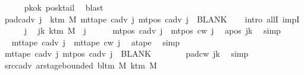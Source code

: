\begin{isabellebody}
\ \ \ \ \isamarkupfalse%
\ pkok\ posk{}{\isacharunderscore}{\kern0pt}tail\ \isamarkupfalse%
\ blast\isanewline
\ \ \isamarkupfalse%
\ pad{\isacharunderscore}{\kern0pt}cadv{\isacharcolon}{\kern0pt}\ {\isachardoublequoteopen}{\isasymforall}j\ {\isasymge}\ k{\isacharunderscore}{\kern0pt}tm\ M{\isachardot}{\kern0pt}\ mt{\isacharunderscore}{\kern0pt}tape\ c{\isacharunderscore}{\kern0pt}adv\ j\ {\isacharparenleft}{\kern0pt}mt{\isacharunderscore}{\kern0pt}pos\ c{\isacharunderscore}{\kern0pt}adv\ j{\isacharparenright}{\kern0pt}\ {\isacharequal}{\kern0pt}\ BLANK{}{\isachardoublequoteclose}\isanewline
\ \ \isamarkupfalse%
\ {\isacharparenleft}{\kern0pt}intro\ allI\ impI{\isacharparenright}{\kern0pt}\isanewline
\ \ \ \ \isamarkupfalse%
\ j\ \isamarkupfalse%
\ jk{\isacharcolon}{\kern0pt}\ {\isachardoublequoteopen}k{\isacharunderscore}{\kern0pt}tm\ M\ {\isasymle}\ j{\isachardoublequoteclose}\isanewline
\ \ \ \ \isamarkupfalse%
\ {\isachardoublequoteopen}mt{\isacharunderscore}{\kern0pt}pos\ c{\isacharunderscore}{\kern0pt}adv\ j\ {\isacharequal}{\kern0pt}\ mt{\isacharunderscore}{\kern0pt}pos\ c{\isacharunderscore}{\kern0pt}w\ j{\isachardoublequoteclose}\ \isamarkupfalse%
\ a{\isacharunderscore}{\kern0pt}pos\ jk\ \isamarkupfalse%
\ simp\isanewline
\ \ \ \ \isamarkupfalse%
\ \isamarkupfalse%
\ {\isachardoublequoteopen}mt{\isacharunderscore}{\kern0pt}tape\ c{\isacharunderscore}{\kern0pt}adv\ j\ {\isacharequal}{\kern0pt}\ mt{\isacharunderscore}{\kern0pt}tape\ c{\isacharunderscore}{\kern0pt}w\ j{\isachardoublequoteclose}\ \isamarkupfalse%
\ a{\isacharunderscore}{\kern0pt}tape\ \isamarkupfalse%
\ simp\isanewline
\ \ \ \ \isamarkupfalse%
\ \isamarkupfalse%
\ {\isachardoublequoteopen}mt{\isacharunderscore}{\kern0pt}tape\ c{\isacharunderscore}{\kern0pt}adv\ j\ {\isacharparenleft}{\kern0pt}mt{\isacharunderscore}{\kern0pt}pos\ c{\isacharunderscore}{\kern0pt}adv\ j{\isacharparenright}{\kern0pt}\ {\isacharequal}{\kern0pt}\ BLANK{}{\isachardoublequoteclose}\isanewline
\ \ \ \ \ \ \isamarkupfalse%
\ pad{\isacharunderscore}{\kern0pt}cw\ jk\ \isamarkupfalse%
\ simp\isanewline
\ \ \isamarkupfalse%
\isanewline
\ \ \isamarkupfalse%
\ src{\isacharunderscore}{\kern0pt}cadv{\isacharcolon}{\kern0pt}\ {\isachardoublequoteopen}ar{\isacharunderscore}{\kern0pt}stage{\isacharunderscore}{\kern0pt}bounded\ {\isacharparenleft}{\kern0pt}bl{\isacharunderscore}{\kern0pt}tm\ M{\isacharparenright}{\kern0pt}\ {\isacharparenleft}{\kern0pt}k{\isacharunderscore}{\kern0pt}tm\ M{\isacharparenright}{\kern0pt}\isanewline

\end{isabellebody}

